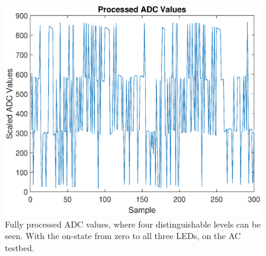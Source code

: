 \begin{figure}[tbp]
  \centering
  \includegraphics[width=\textwidth]{chapters/evaluation-chapters/hardware/ac/processed-ac-testbed-adc-data.eps}
    \caption{Fully processed ADC values, where four distinguishable levels can be seen. With the on-state from zero to all three LEDs, on the AC testbed.}
  \label{fig:processed-ac-testbed-adc-data}
\end{figure}






